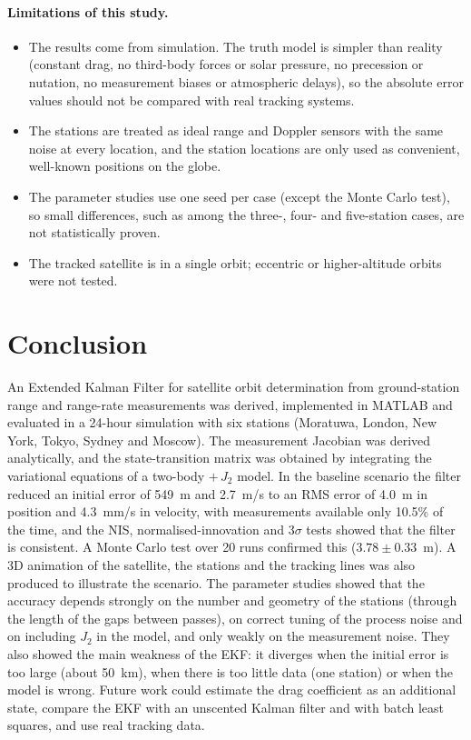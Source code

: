\documentclass[11pt,a4paper]{article}
\begin{document}
\paragraph{Limitations of this study.}
\begin{itemize}
  \item The results come from simulation. The truth model is simpler than reality (constant drag, no third-body forces or solar pressure, no precession or nutation, no measurement biases or atmospheric delays), so the absolute error values should not be compared with real tracking systems.
  \item The stations are treated as ideal range and Doppler sensors with the same noise at every location, and the station locations are only used as convenient, well-known positions on the globe.
  \item The parameter studies use one seed per case (except the Monte Carlo test), so small differences, such as among the three-, four- and five-station cases, are not statistically proven.
  \item The tracked satellite is in a single orbit; eccentric or higher-altitude orbits were not tested.
\end{itemize}

\clearpage
\section{Conclusion}
An Extended Kalman Filter for satellite orbit determination from ground-station range and range-rate measurements was derived, implemented in MATLAB and evaluated in a 24-hour simulation with six stations (Moratuwa, London, New York, Tokyo, Sydney and Moscow).
The measurement Jacobian was derived analytically, and the state-transition matrix was obtained by integrating the variational equations of a two-body $+\,J_2$ model.
In the baseline scenario the filter reduced an initial error of 549~m and 2.7~m/s to an RMS error of 4.0~m in position and 4.3~mm/s in velocity, with measurements available only 10.5\% of the time, and the NIS, normalised-innovation and $3\sigma$ tests showed that the filter is consistent. A Monte Carlo test over 20 runs confirmed this ($3.78\pm0.33$~m). A 3D animation of the satellite, the stations and the tracking lines was also produced to illustrate the scenario.
The parameter studies showed that the accuracy depends strongly on the number and geometry of the stations (through the length of the gaps between passes), on correct tuning of the process noise and on including $J_2$ in the model, and only weakly on the measurement noise. They also showed the main weakness of the EKF: it diverges when the initial error is too large (about 50~km), when there is too little data (one station) or when the model is wrong.
Future work could estimate the drag coefficient as an additional state, compare the EKF with an unscented Kalman filter and with batch least squares, and use real tracking data.
\end{document}
